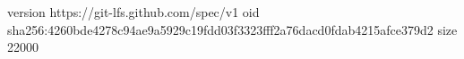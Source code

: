 version https://git-lfs.github.com/spec/v1
oid sha256:4260bde4278c94ae9a5929c19fdd03f3323fff2a76dacd0fdab4215afce379d2
size 22000
